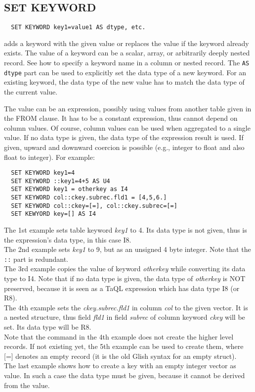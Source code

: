 \subsection{SET KEYWORD}
\begin{verbatim}
  SET KEYWORD key1=value1 AS dtype, etc.
\end{verbatim}
adds a keyword with the given value or replaces
the value if the keyword already exists.
The value of a keyword
can be a scalar, array, or arbitrarily deeply nested record.
See 
how to specify a keyword name in a column or nested record.
The {\tt AS dtype} part can be used to explicitly set the data type of
a new keyword. For an existing keyword, the data type of the new value
has to match the data type of the current value.

The value can be an expression, possibly using values
from another table given in the FROM clause. It has to be a constant
expression, thus cannot depend on column values. Of course, column values
can be used when aggregated to a single value. If no data type is
given, the data type of the expression result is used. If given, upward and
downward coercion is possible (e.g., integer to float and also float to integer).
For example:
\begin{verbatim}
  SET KEYWORD key1=4
  SET KEYWORD ::key1=4+5 AS U4
  SET KEYWORD key1 = otherkey as I4
  SET KEYWORD col::ckey.subrec.fld1 = [4,5,6.]
  SET KEYWORD col::ckey=[=], col::ckey.subrec=[=]
  SET KEWYORD key=[] AS I4
\end{verbatim}
The 1st example sets table keyword {\em key1} to 4. Its data type
is not given, thus is the expression's data type, in this case I8.
\\The 2nd example sets {\em key1} to 9, but as an unsigned 4 byte
integer. Note that the \texttt{::} part is redundant.
\\The 3rd example copies the value of keyword {\em otherkey} while
converting its data type to I4. Note that if no data type
is given, the data type of {\em otherkey} is NOT preserved, because it
is seen as a TaQL expression which has data type I8 (or R8).
\\The 4th example sets the {\em ckey.subrec.fld1} in column {\em col} to
the given vector. It is a nested structure, thus field {\em fld1} in field
{\em subrec} of column keyword {\em ckey} will be set. 
Its data type will be R8. 
\\Note that the command in the 4th example does not create the
higher level records. If not existing yet, the 5th example can be
used to create them, where [=] denotes
an empty record (it is the old Glish syntax for an empty struct).
\\The last example shows how to create a key with an empty integer
vector as value. In such a case the data type must be given, because it
cannot be derived from the value.

